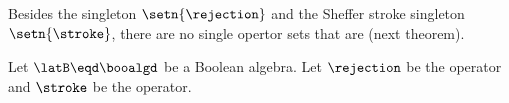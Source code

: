 Besides the  singleton $\setn{\rejection}$ and
the Sheffer stroke singleton $\setn{\stroke}$,
there are no single opertor sets that are 
(next theorem).
\begin{theorem}
\label{thm:denial}
Let $\latB\eqd\booalgd$ be a Boolean algebra.
Let $\rejection$ be the  operator and
    $\stroke$ be the  operator.
\end{theorem}


